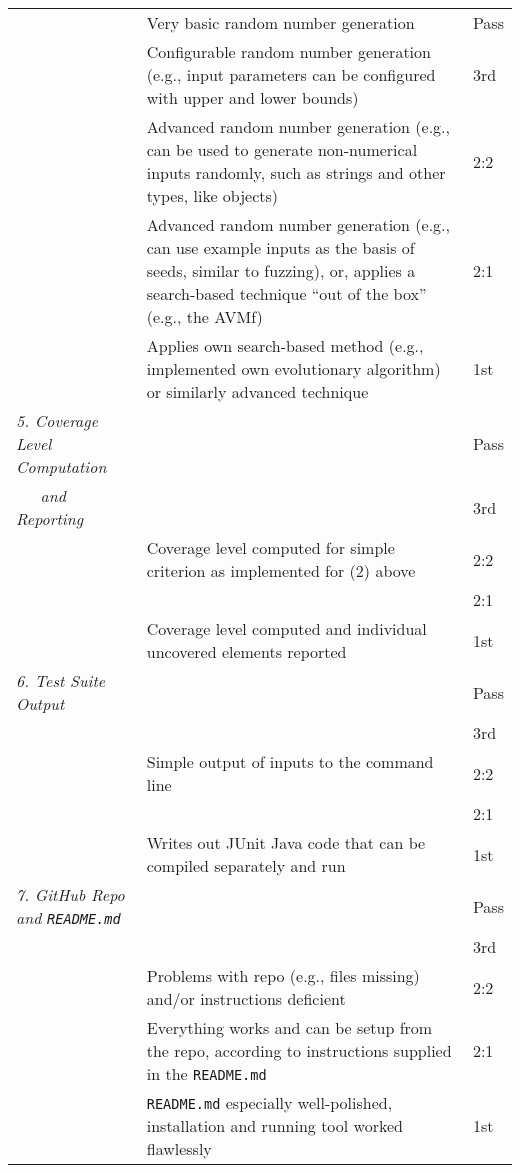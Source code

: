 {\begin{tabular}{lp{30em}l}
    & Very basic random number generation & Pass \\ \cline {2-3}
    & Configurable random number generation (e.g., input parameters can be configured
    with upper and lower bounds) & 3rd  \\ \cline {2-3}
    & Advanced random number generation (e.g., can be used to generate
    non-numerical inputs randomly, such as strings and other types, like
    objects) & 2:2  \\ \cline {2-3}
    & Advanced random number generation (e.g., can use example inputs as the
    basis of seeds, similar to fuzzing), 
    or, applies a search-based technique ``out of the box'' (e.g., the AVMf) &
    2:1  \\ \cline {2-3}
    & Applies own search-based method (e.g., implemented own evolutionary algorithm) or similarly advanced technique & 1st  \\
    
    \midrule

    {\it 5. Coverage Level Computation}

    & & Pass \\
    {\it ~~~and Reporting} & & 3rd  \\
    & Coverage level computed for simple criterion as implemented for (2) above
    & 2:2  \\ \cline{2-3}
    & & 2:1 \\ 
    & Coverage level computed and individual uncovered elements reported  & 1st  \\

    \midrule

    {\it 6. Test Suite Output}

    & & Pass \\
    & & 3rd  \\
    & Simple output of inputs to the command line & 2:2  \\ \cline{2-3}
    & & 2:1  \\
    & Writes out JUnit Java code that can be compiled separately and run & 1st  \\

    \midrule

    {\it 7. GitHub Repo and {\tt README.md}}

    & & Pass \\
    & & 3rd  \\
    & Problems with repo (e.g., files missing) and/or instructions deficient &
    2:2  \\ \cline{2-3}
    & Everything works and can be setup from the repo, according to instructions
    supplied in the {\tt README.md} & 2:1  \\ \cline{2-3}
    & {\tt README.md} especially well-polished, installation and running tool
    worked flawlessly& 1st  \\

    \bottomrule

\end{tabular}
}

